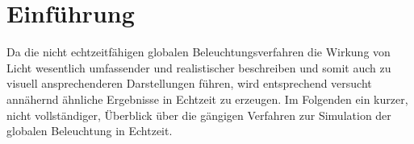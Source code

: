 \chapter{Einführung}

Da die nicht echtzeitfähigen globalen Beleuchtungsverfahren die Wirkung von Licht wesentlich umfassender und realistischer beschreiben und somit auch zu visuell ansprechenderen Darstellungen führen, wird entsprechend versucht annähernd ähnliche Ergebnisse in Echtzeit zu erzeugen. Im Folgenden ein kurzer, nicht vollständiger, Überblick über die gängigen Verfahren zur Simulation der globalen Beleuchtung in Echtzeit.

\blindtext